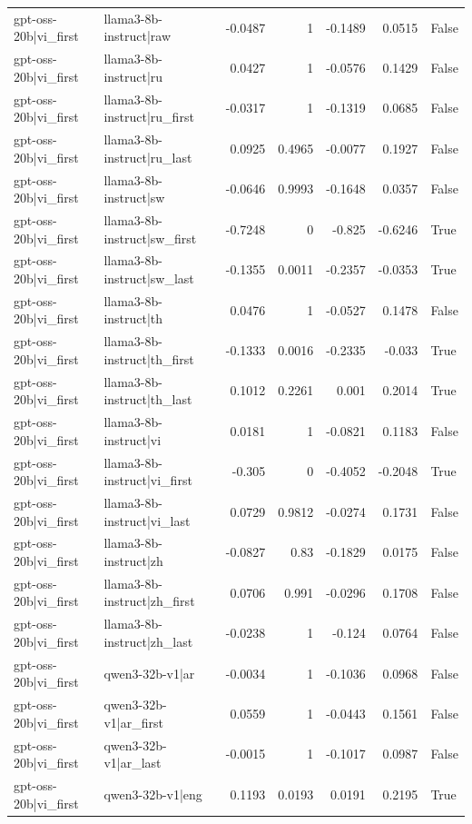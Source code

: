 \begin{table}
\begin{tabular}{l l r r r r l}
gpt-oss-20b|vi_first & llama3-8b-instruct|raw & -0.0487 & 1 & -0.1489 & 0.0515 & False \\
gpt-oss-20b|vi_first & llama3-8b-instruct|ru & 0.0427 & 1 & -0.0576 & 0.1429 & False \\
gpt-oss-20b|vi_first & llama3-8b-instruct|ru_first & -0.0317 & 1 & -0.1319 & 0.0685 & False \\
gpt-oss-20b|vi_first & llama3-8b-instruct|ru_last & 0.0925 & 0.4965 & -0.0077 & 0.1927 & False \\
gpt-oss-20b|vi_first & llama3-8b-instruct|sw & -0.0646 & 0.9993 & -0.1648 & 0.0357 & False \\
gpt-oss-20b|vi_first & llama3-8b-instruct|sw_first & -0.7248 & 0 & -0.825 & -0.6246 & True \\
gpt-oss-20b|vi_first & llama3-8b-instruct|sw_last & -0.1355 & 0.0011 & -0.2357 & -0.0353 & True \\
gpt-oss-20b|vi_first & llama3-8b-instruct|th & 0.0476 & 1 & -0.0527 & 0.1478 & False \\
gpt-oss-20b|vi_first & llama3-8b-instruct|th_first & -0.1333 & 0.0016 & -0.2335 & -0.033 & True \\
gpt-oss-20b|vi_first & llama3-8b-instruct|th_last & 0.1012 & 0.2261 & 0.001 & 0.2014 & True \\
gpt-oss-20b|vi_first & llama3-8b-instruct|vi & 0.0181 & 1 & -0.0821 & 0.1183 & False \\
gpt-oss-20b|vi_first & llama3-8b-instruct|vi_first & -0.305 & 0 & -0.4052 & -0.2048 & True \\
gpt-oss-20b|vi_first & llama3-8b-instruct|vi_last & 0.0729 & 0.9812 & -0.0274 & 0.1731 & False \\
gpt-oss-20b|vi_first & llama3-8b-instruct|zh & -0.0827 & 0.83 & -0.1829 & 0.0175 & False \\
gpt-oss-20b|vi_first & llama3-8b-instruct|zh_first & 0.0706 & 0.991 & -0.0296 & 0.1708 & False \\
gpt-oss-20b|vi_first & llama3-8b-instruct|zh_last & -0.0238 & 1 & -0.124 & 0.0764 & False \\
gpt-oss-20b|vi_first & qwen3-32b-v1|ar & -0.0034 & 1 & -0.1036 & 0.0968 & False \\
gpt-oss-20b|vi_first & qwen3-32b-v1|ar_first & 0.0559 & 1 & -0.0443 & 0.1561 & False \\
gpt-oss-20b|vi_first & qwen3-32b-v1|ar_last & -0.0015 & 1 & -0.1017 & 0.0987 & False \\
gpt-oss-20b|vi_first & qwen3-32b-v1|eng & 0.1193 & 0.0193 & 0.0191 & 0.2195 & True \\

\end{tabular}
\end{table}
